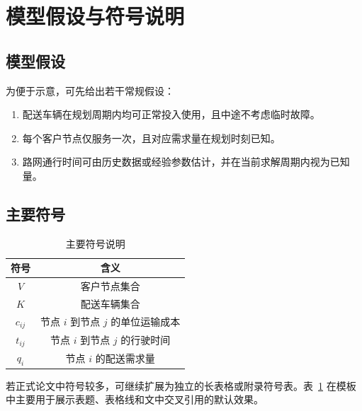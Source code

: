 \section{模型假设与符号说明}

\subsection{模型假设}

为便于示意，可先给出若干常规假设：
\begin{enumerate}
    \item 配送车辆在规划周期内均可正常投入使用，且中途不考虑临时故障。
    \item 每个客户节点仅服务一次，且对应需求量在规划时刻已知。
    \item 路网通行时间可由历史数据或经验参数估计，并在当前求解周期内视为已知量。
\end{enumerate}

\subsection{主要符号}

\begin{table}[H]
    \centering
    \caption{主要符号说明}
    \label{tab:symbols}
    \begin{tabular}{cc}
        \toprule
        符号 & 含义 \\
        \midrule
        $V$ & 客户节点集合 \\
        $K$ & 配送车辆集合 \\
        $c_{ij}$ & 节点 $i$ 到节点 $j$ 的单位运输成本 \\
        $t_{ij}$ & 节点 $i$ 到节点 $j$ 的行驶时间 \\
        $q_i$ & 节点 $i$ 的配送需求量 \\
        \bottomrule
    \end{tabular}
\end{table}

若正式论文中符号较多，可继续扩展为独立的长表格或附录符号表。表~\ref{tab:symbols} 在模板中主要用于展示表题、表格线和文中交叉引用的默认效果。
